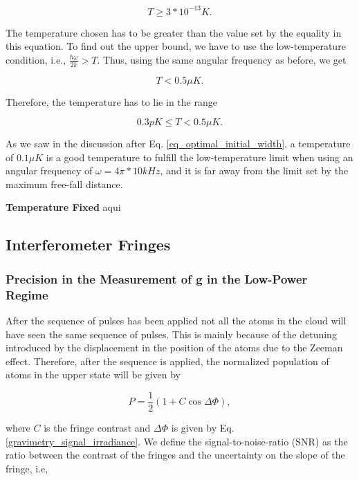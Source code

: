 \documentclass{article}
\begin{document}
\begin{equation}
    T \ge 3*10^{-13} K.
\end{equation}

The temperature chosen has to be greater than the value set by the equality in this equation. To find out the upper bound, we have to use the low-temperature condition, i.e., $\frac{\hbar \omega}{2k} > T$. Thus, using the same angular frequency as before, we get

\begin{equation}
    T < 0.5 \mu K.
\end{equation}

Therefore, the temperature has to lie in the range

\begin{equation}
    0.3 pK \le T < 0.5 \mu K.
\end{equation}

As we saw in the discussion after Eq. \ref{eq_optimal_initial_width}, a temperature of $0.1 \mu K$ is a good temperature to fulfill the low-temperature limit when using an angular frequency of $\omega = 4\pi*10kHz$, and it is far away from the limit set by the maximum free-fall distance.

\vspace{5mm}
\textbf{Temperature Fixed}
aqui

\subsection{Interferometer Fringes}
\subsubsection{Precision in the Measurement of g in the Low-Power Regime}
After the sequence of pulses has been applied not all the atoms in the cloud will have seen the same sequence of pulses. This is mainly because of the detuning introduced by the displacement in the position of the atoms due to the Zeeman effect. Therefore, after the sequence is applied, the normalized population of atoms in the upper state will be given by

\begin{equation}\label{fringes_equation}
    P = \frac{1}{2}(1+C\cos{\Delta \Phi}),
\end{equation}

where $C$ is the fringe contrast and $\Delta \Phi$ is given by Eq. \ref{gravimetry_signal_irradiance}. We define the signal-to-noise-ratio (SNR) as the ratio between the contrast of the fringes and the uncertainty on the slope of the fringe, i.e,
\end{document}
